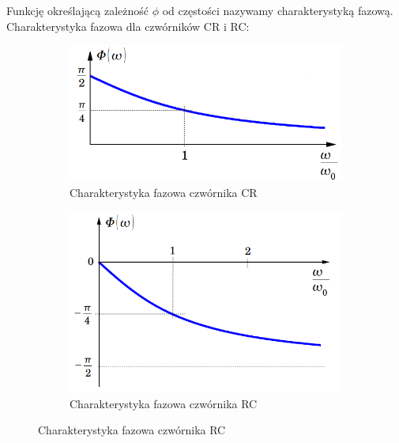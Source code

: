 Funkcję określającą zależność $\phi$ od częstości nazywamy charakterystyką fazową. \\
Charakterystyka fazowa dla czwórników CR i RC:
\begin{figure}[H]
    \centering
    \begin{subfigure}[h]{0.45\textwidth}
        \includegraphics[width=\textwidth]{img_wyklad/teor_faza_CR.png}
        \caption*{Charakterystyka fazowa czwórnika CR}
    \end{subfigure}
    \begin{subfigure}[h]{0.45\textwidth}
        \includegraphics[width=\textwidth]{img_wyklad/teor_faza_RC.png}
        \caption*{Charakterystyka fazowa czwórnika RC}
    \end{subfigure}
\end{figure}